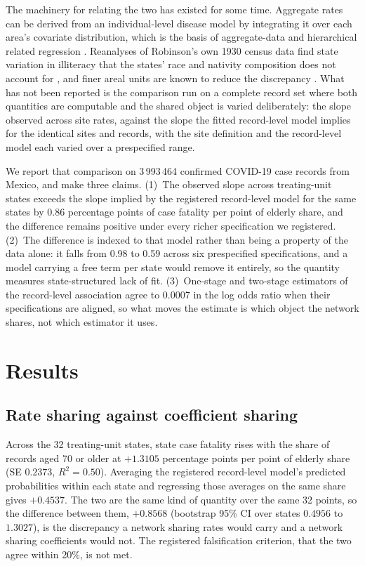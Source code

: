 \documentclass[11pt]{article}
\begin{document}
The machinery for relating the two has existed for some time.  Aggregate
rates can be derived from an individual-level disease model by
integrating it over each area's covariate distribution, which is the
basis of aggregate-data and hierarchical related regression
\cite{wakefield2008twophase,jackson2008hierarchical,prentice1995aggregate}.
Reanalyses of Robinson's own 1930 census data find state variation in
illiteracy that the states' race and nativity composition does not
account for \cite{subramanian2009revisiting}, and finer areal units are
known to reduce the discrepancy \cite{best2001ecological,lancaster2006reducing}.
What has not been reported is the comparison run on a complete record
set where both quantities are computable and the shared object is varied
deliberately: the slope observed across site rates, against the slope the
fitted record-level model implies for the identical sites and records,
with the site definition and the record-level model each varied over a
prespecified range.

We report that comparison on 3\,993\,464 confirmed COVID-19 case records
from Mexico, and make three claims.  (1)~The observed slope across
treating-unit states exceeds the slope implied by the registered
record-level model for the same states by 0.86 percentage points of case
fatality per point of elderly share, and the difference remains positive
under every richer specification we registered.  (2)~The difference is
indexed to that model rather than being a property of the data alone: it
falls from 0.98 to 0.59 across six prespecified specifications, and a
model carrying a free term per state would remove it entirely, so the
quantity measures state-structured lack of fit.  (3)~One-stage and
two-stage estimators of the record-level association agree to 0.0007 in
the log odds ratio when their specifications are aligned, so what moves
the estimate is which object the network shares, not which estimator it
uses.

\section{Results}

\subsection{Rate sharing against coefficient sharing}

Across the 32 treating-unit states, state case fatality rises with the
share of records aged 70 or older at $+1.3105$ percentage points per
point of elderly share (SE $0.2373$, $R^2 = 0.50$).  Averaging the
registered record-level model's predicted probabilities within each
state and regressing those averages on the same share gives $+0.4537$.
The two are the same kind of quantity over the same 32 points, so the
difference between them, $+0.8568$ (bootstrap 95\% CI over states
$0.4956$ to $1.3027$), is the discrepancy a network sharing rates would
carry and a network sharing coefficients would not.  The registered
falsification criterion, that the two agree within 20\%, is not met.
\end{document}

